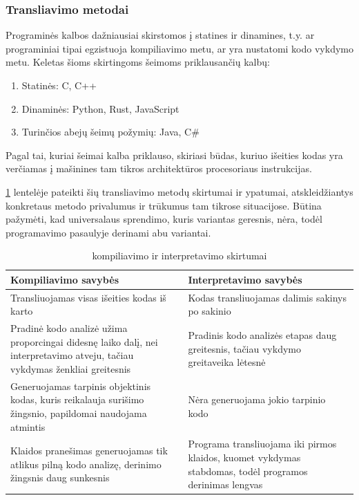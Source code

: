 \documentclass{VUMIFPSkursinis}
\begin{document}
\subsubsection{Transliavimo metodai}
Programinės kalbos dažniausiai skirstomos į statines ir dinamines, t.y. ar programiniai tipai egzistuoja kompiliavimo metu, ar yra nustatomi kodo vykdymo metu. Keletas šioms skirtingoms šeimoms priklausančių kalbų:
\begin{enumerate}
    \item Statinės: C, C++
    \item Dinaminės: Python, Rust, JavaScript
    \item Turinčios abejų šeimų požymių: Java, C\#
\end{enumerate} Pagal tai, kuriai šeimai kalba priklauso, skiriasi būdas, kuriuo išeities kodas yra verčiamas į mašinines tam tikros architektūros procesoriaus instrukcijas.

\ref{tab:kompiliavimas_interpretavimas} lentelėje pateikti šių transliavimo metodų skirtumai ir ypatumai, atskleidžiantys konkretaus metodo privalumus ir trūkumus tam tikrose situacijose. Būtina pažymėti, kad universalaus sprendimo, kuris variantas geresnis, nėra, todėl programavimo pasaulyje derinami abu variantai.

\begin{table}[H]
  \centering
  \caption{kompiliavimo ir interpretavimo skirtumai \cite{PRO19}}
  {\begin{tabular}{|m{13em}|m{13em}|} \hline
     Kompiliavimo savybės & Interpretavimo savybės \\
    \hline
    Transliuojamas visas išeities kodas iš karto & Kodas transliuojamas dalimis 
 sakinys po sakinio \\
 \hline
 Pradinė kodo analizė 
     užima proporcingai didesnę laiko dalį, nei interpretavimo atveju, 
     tačiau vykdymas ženkliai greitesnis &
     Pradinis kodo analizės etapas daug greitesnis, 
     tačiau vykdymo greitaveika lėtesnė   \\
    \hline
     Generuojamas tarpinis objektinis kodas, kuris
 reikalauja surišimo žingsnio, papildomai naudojama atmintis & Nėra generuojama jokio tarpinio kodo \\
 \hline
 Klaidos pranešimas 
 generuojamas tik atlikus pilną kodo analizę, derinimo žingsnis daug sunkesnis &
 Programa transliuojama iki pirmos klaidos, kuomet 
 vykdymas stabdomas, todėl programos derinimas lengvas  \\
 \hline
  \end{tabular}}
  \label{tab:kompiliavimas_interpretavimas}
\end{table}
\end{document}
